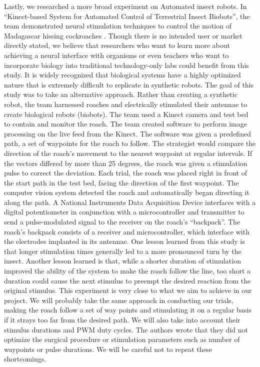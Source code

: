\documentclass{article}
\begin{document}
\par Lastly, we researched a more broad experiment on Automated insect robots. In ``Kinect-based System for Automated Control of Terrestrial Insect Biobots'', the team demonstrated neural stimulation techniques to control the motion of Madagascar hissing cockroaches \cite{whitmire2013kinect}. Though there is no intended user or market directly stated, we believe that researchers who want to learn more about achieving a neural interface with organisms or even teachers who want to incorporate biology into traditional technology-only labs could benefit from this study. It is widely recognized that biological systems have a highly optimized nature that is extremely difficult to replicate in synthetic robots. The goal of this study was to take an alternative approach. Rather than creating a synthetic robot, the team harnessed roaches and electrically stimulated their antennae to create biological robots (biobots). The team used a Kinect camera and test bed to contain and monitor the roach. The team created software to perform image processing on the live feed from the Kinect. The software was given a predefined path, a set of waypoints for the roach to follow. The strategist would compare the direction of the roach’s movement to the nearest waypoint at regular intervals. If the vectors differed by more than 25 degrees, the roach was given a stimulation pulse to correct the deviation. Each trial, the roach was placed right in front of the start path in the test bed, facing the direction of the first waypoint. The computer vision system detected the roach and automatically began directing it along the path. A National Instruments Data Acquisition Device interfaces with a digital potentiometer in conjunction with a microcontroller and transmitter to send a pulse-modulated signal to the receiver on the roach’s ``backpack''. The roach’s backpack consists of a receiver and microcontroller, which interface with the electrodes implanted in its antennae. One lesson learned from this study is that longer stimulation times generally led to a more pronounced turn by the insect. Another lesson learned is that, while a shorter duration of stimulation improved the ability of the system to make the roach follow the line, too short a duration could cause the next stimulus to preempt the desired reaction from the original stimulus. This experiment is very close to what we aim to achieve in our project. We will probably take the same approach in conducting our trials, making the roach follow a set of way points and stimulating it on a regular basis if it strays too far from the desired path. We will also take into account their stimulus durations and PWM duty cycles. The authors wrote that they did not optimize the surgical procedure or stimulation parameters such as number of waypoints or pulse durations. We will be careful not to repeat these shortcomings.
\end{document}
